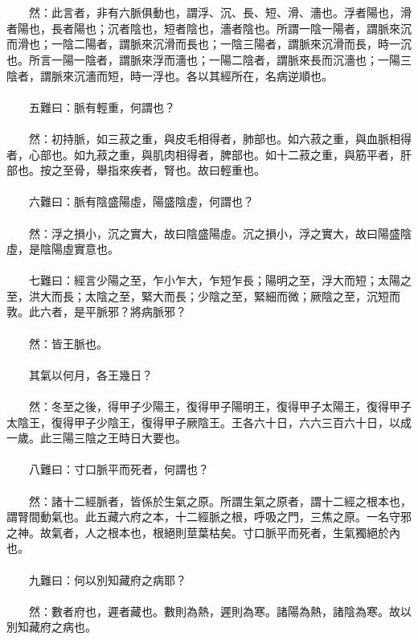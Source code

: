 \\\\
　　然：此言者，非有六脈俱動也，謂浮、沉、長、短、滑、濇也。浮者陽也，滑者陽也，長者陽也；沉者陰也，短者陰也，濇者陰也。所謂一陰一陽者，謂脈來沉而滑也；一陰二陽者，謂脈來沉滑而長也；一陰三陽者，謂脈來沉滑而長，時一沉也。所言一陽一陰者，謂脈來浮而濇也；一陽二陰者，謂脈來長而沉濇也；一陽三陰者，謂脈來沉濇而短，時一浮也。各以其經所在，名病逆順也。
\\\\
　　五難曰：脈有輕重，何謂也？
\\\\
　　然：初持脈，如三菽之重，與皮毛相得者，肺部也。如六菽之重，與血脈相得者，心部也。如九菽之重，與肌肉相得者，脾部也。如十二菽之重，與筋平者，肝部也。按之至骨，舉指來疾者，腎也。故曰輕重也。
\\\\
　　六難曰：脈有陰盛陽虛，陽盛陰虛，何謂也？
\\\\
　　然：浮之損小，沉之實大，故曰陰盛陽虛。沉之損小，浮之實大，故曰陽盛陰虛，是陰陽虛實意也。
\\\\
　　七難曰：經言少陽之至，乍小乍大，乍短乍長；陽明之至，浮大而短；太陽之至，洪大而長；太陰之至，緊大而長；少陰之至，緊細而微；厥陰之至，沉短而敦。此六者，是平脈邪？將病脈邪？
\\\\
　　然：皆王脈也。
\\\\
　　其氣以何月，各王幾日？
\\\\
　　然：冬至之後，得甲子少陽王，復得甲子陽明王，復得甲子太陽王，復得甲子太陰王，復得甲子少陰王，復得甲子厥陰王。王各六十日，六六三百六十日，以成一歲。此三陽三陰之王時日大要也。
\\\\
　　八難曰：寸口脈平而死者，何謂也？
\\\\
　　然：諸十二經脈者，皆係於生氣之原。所謂生氣之原者，謂十二經之根本也，謂腎間動氣也。此五藏六府之本，十二經脈之根，呼吸之門，三焦之原。一名守邪之神。故氣者，人之根本也，根絕則莖葉枯矣。寸口脈平而死者，生氣獨絕於內也。
\\\\
　　九難曰：何以別知藏府之病耶？
\\\\
　　然：數者府也，遲者藏也。數則為熱，遲則為寒。諸陽為熱，諸陰為寒。故以別知藏府之病也。
\\\\
